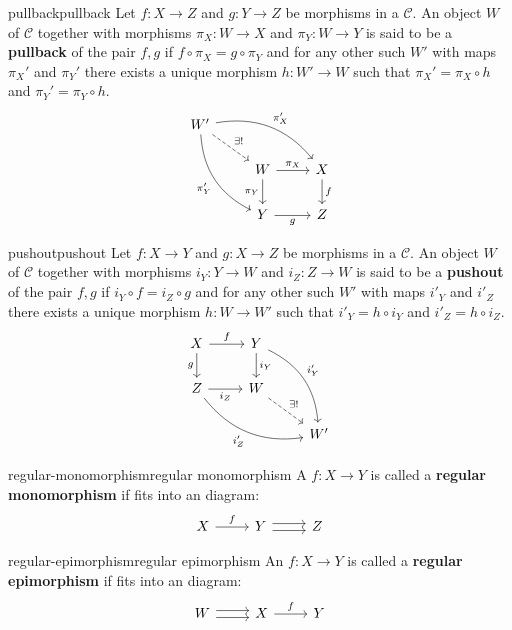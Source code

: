 \begin{topic}{pullback}{pullback}
    Let $f : X \to Z$ and $g : Y \to Z$ be morphisms in a  $\mathcal{C}$. An object $W$ of $\mathcal{C}$ together with morphisms $\pi_X: W \to X$ and $\pi_Y : W \to Y$ is said to be a \textbf{pullback} of the pair $f, g$ if $f \circ \pi_X = g \circ \pi_Y$ and for any other such $W'$ with maps $\pi_X'$ and $\pi_Y'$ there exists a unique morphism $h : W' \to W$ such that $\pi_X' = \pi_X \circ h$ and $\pi_Y' = \pi_Y \circ h$.
    \[ \begin{tikzcd} W' \arrow[bend left=30]{rrd}{\pi_X'} \arrow[swap, bend right=30]{ddr}{\pi_Y'} \arrow[dashed]{rd}{\exists!} & & \\ & W \arrow{r}{\pi_X} \arrow[swap]{d}{\pi_Y} & X \arrow{d}{f} \\ & Y \arrow[swap]{r}{g} & Z \end{tikzcd} \]
\end{topic}

\begin{topic}{pushout}{pushout}
    Let $f : X \to Y$ and $g : X \to Z$ be morphisms in a  $\mathcal{C}$. An object $W$ of $\mathcal{C}$ together with morphisms $i_Y: Y \to W$ and $i_Z : Z \to W$ is said to be a \textbf{pushout} of the pair $f, g$ if $i_Y \circ f = i_Z \circ g$ and for any other such $W'$ with maps $i'_Y$ and $i'_Z$ there exists a unique morphism $h : W \to W'$ such that $i'_Y = h \circ i_Y$ and $i'_Z = h \circ i_Z$.
    \[ \begin{tikzcd} X \arrow{r}{f} \arrow[swap]{d}{g} & Y \arrow{d}{i_Y} \arrow[bend left=30]{rdd}{i'_Y} & \\ Z \arrow[swap]{r}{i_Z} \arrow[swap, bend right=30]{drr}{i'_Z} & W \arrow[dashed]{rd}{\exists!} & \\ & & W' \end{tikzcd} \]
\end{topic}

\begin{topic}{regular-monomorphism}{regular monomorphism}
    A  $f : X \to Y$ is called a \textbf{regular monomorphism} if fits into an  diagram:
    \[ \begin{tikzcd} X \arrow{r}{f} & Y \arrow[shift left=0.25em]{r} \arrow[shift right=0.25em]{r} & Z \end{tikzcd} \]
\end{topic}

\begin{topic}{regular-epimorphism}{regular epimorphism}
    An  $f : X \to Y$ is called a \textbf{regular epimorphism} if fits into an  diagram:
    \[ \begin{tikzcd} W \arrow[shift left=0.25em]{r} \arrow[shift right=0.25em]{r} & X \arrow{r}{f} & Y \end{tikzcd} \]
\end{topic}

